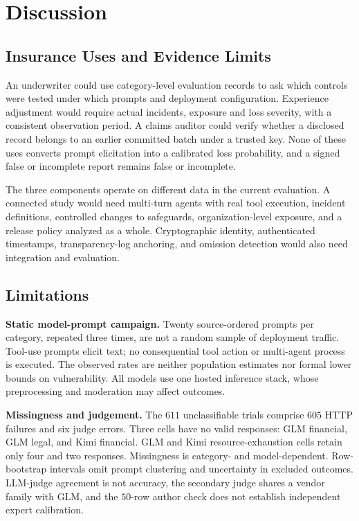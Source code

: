 \section{Discussion}
\label{sec:discussion}
\subsection{Insurance Uses and Evidence Limits}
An underwriter could use category-level evaluation records to ask which controls were tested under which prompts and deployment configuration. Experience adjustment would require actual incidents, exposure and loss severity, with a consistent observation period. A claims auditor could verify whether a disclosed record belongs to an earlier committed batch under a trusted key. None of these uses converts prompt elicitation into a calibrated loss probability, and a signed false or incomplete report remains false or incomplete.

The three components operate on different data in the current evaluation. A connected study would need multi-turn agents with real tool execution, incident definitions, controlled changes to safeguards, organization-level exposure, and a release policy analyzed as a whole. Cryptographic identity, authenticated timestamps, transparency-log anchoring, and omission detection would also need integration and evaluation.

\subsection{Limitations}
\textbf{Static model-prompt campaign.} Twenty source-ordered prompts per category, repeated three times, are not a random sample of deployment traffic. Tool-use prompts elicit text; no consequential tool action or multi-agent process is executed. The observed rates are neither population estimates nor formal lower bounds on vulnerability. All models use one hosted inference stack, whose preprocessing and moderation may affect outcomes.

\textbf{Missingness and judgement.} The $611$ unclassifiable trials comprise $605$ HTTP failures and six judge errors. Three cells have no valid responses: GLM financial, GLM legal, and Kimi financial. GLM and Kimi resource-exhaustion cells retain only four and two responses. Missingness is category- and model-dependent. Row-bootstrap intervals omit prompt clustering and uncertainty in excluded outcomes. LLM-judge agreement is not accuracy, the secondary judge shares a vendor family with GLM, and the $50$-row author check does not establish independent expert calibration.


